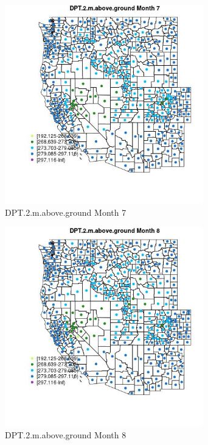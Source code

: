 \begin{figure} 
\centering  
\includegraphics[width=0.77\textwidth]{Code_Outputs/df_report_ML_predictors_CountyCentroid_Locations_Dates_2008-01-01to2018-12-31_MapObsMo7DPT2maboveground.jpg} 
\caption{\label{fig:df_report_ML_predictors_CountyCentroid_Locations_Dates_2008-01-01to2018-12-31MapObsMo7DPT2maboveground}DPT.2.m.above.ground Month 7} 
\end{figure} 
 

\begin{figure} 
\centering  
\includegraphics[width=0.77\textwidth]{Code_Outputs/df_report_ML_predictors_CountyCentroid_Locations_Dates_2008-01-01to2018-12-31_MapObsMo8DPT2maboveground.jpg} 
\caption{\label{fig:df_report_ML_predictors_CountyCentroid_Locations_Dates_2008-01-01to2018-12-31MapObsMo8DPT2maboveground}DPT.2.m.above.ground Month 8} 
\end{figure} 
 

